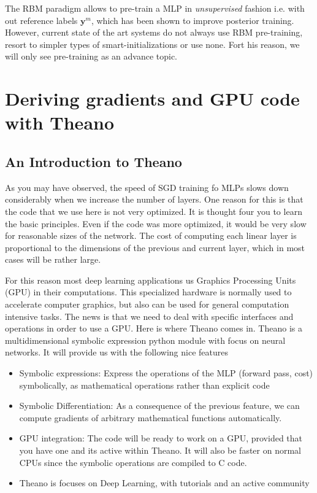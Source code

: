 The RBM paradigm allows to pre-train a MLP in \textit{unsupervised} fashion i.e. with out reference labels $\mathbf{y}^m$, which has been shown to improve posterior training. However, current state of the art systems do not always use RBM pre-training, resort to simpler types of smart-initializations or use none. Fort his reason, we will only see pre-training as an advance topic.  

\section{Deriving gradients and GPU code with Theano}

\subsection{An Introduction to Theano}

As you may have observed, the speed of SGD training fo MLPs slows down considerably when we increase the number of layers. One reason for this is that the code that we use here is not very optimized. It is thought four you to learn the basic principles. Even if the code was more optimized, it would be very slow for reasonable sizes of the network. The cost of computing each linear layer is proportional to the dimensions of the previous and current layer, which in most cases will be rather large. 

For this reason most deep learning applications us Graphics Processing Units (GPU) in their computations. This specialized hardware is normally used to accelerate computer graphics, but also can be used for general computation intensive tasks. The news is that we need to deal with specific interfaces and operations in order to use a GPU. Here is where Theano comes in. Theano is a multidimensional symbolic expression python module with focus on neural networks. It will provide us with the following nice features

\begin{itemize}
\item Symbolic expressions: Express the operations of the MLP (forward pass, cost) symbolically, as mathematical operations rather than explicit code 
\item Symbolic Differentiation: As a consequence of the previous feature, we can compute gradients of arbitrary mathematical functions automatically.   
\item GPU integration: The code will be ready to work on a GPU, provided that you have one and its active within Theano. It will also be faster on normal CPUs since the symbolic operations are compiled to C code. 
\item Theano is focuses on Deep Learning, with tutorials and an active community   
\end{itemize}

